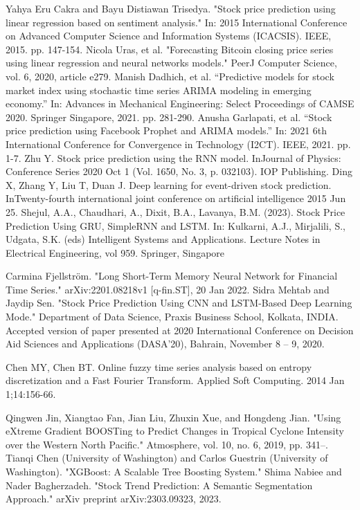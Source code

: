 \documentclass{ieeeojies}
\begin{document}
\begin{thebibliography}{00}
Yahya Eru Cakra and Bayu Distiawan Trisedya. "Stock price prediction using linear regression based on sentiment analysis." In: 2015 International Conference on Advanced Computer Science and Information Systems (ICACSIS). IEEE, 2015. pp. 147-154.
Nicola Uras, et al. "Forecasting Bitcoin closing price series using linear regression and neural networks models." PeerJ Computer Science, vol. 6, 2020, article e279.
Manish Dadhich, et al. ``Predictive models for stock market index using stochastic time series ARIMA modeling in emerging economy.'' In: Advances in Mechanical Engineering: Select Proceedings of CAMSE 2020. Springer Singapore, 2021. pp. 281-290.
Anusha Garlapati, et al. ``Stock price prediction using Facebook Prophet and ARIMA models.'' In: 2021 6th International Conference for Convergence in Technology (I2CT). IEEE, 2021. pp. 1-7.
Zhu Y. Stock price prediction using the RNN model. InJournal of Physics: Conference Series 2020 Oct 1 (Vol. 1650, No. 3, p. 032103). IOP Publishing. 
Ding X, Zhang Y, Liu T, Duan J. Deep learning for event-driven stock prediction. InTwenty-fourth international joint conference on artificial intelligence 2015 Jun 25.
Shejul, A.A., Chaudhari, A., Dixit, B.A., Lavanya, B.M. (2023). Stock Price Prediction Using GRU, SimpleRNN and LSTM. In: Kulkarni, A.J., Mirjalili, S., Udgata, S.K. (eds) Intelligent Systems and Applications. Lecture Notes in Electrical Engineering, vol 959. Springer, Singapore 

Carmina Fjellström. "Long Short-Term Memory Neural Network for Financial Time Series." arXiv:2201.08218v1 [q-fin.ST], 20 Jan 2022.
Sidra Mehtab and Jaydip Sen. "Stock Price Prediction Using CNN and LSTM-Based Deep Learning Mode." Department of Data Science, Praxis Business School, Kolkata, INDIA. Accepted version of paper presented at 2020 International Conference on Decision Aid Sciences and Applications (DASA’20), Bahrain, November 8 – 9, 2020.

Chen MY, Chen BT. Online fuzzy time series analysis based on entropy discretization and a Fast Fourier Transform. Applied Soft Computing. 2014 Jan 1;14:156-66. 

Qingwen Jin, Xiangtao Fan, Jian Liu, Zhuxin Xue, and Hongdeng Jian. "Using eXtreme Gradient BOOSTing to Predict Changes in Tropical Cyclone Intensity over the Western North Pacific." Atmosphere, vol. 10, no. 6, 2019, pp. 341–.
Tianqi Chen (University of Washington) and Carlos Guestrin (University of Washington). "XGBoost: A Scalable Tree Boosting System."
Shima Nabiee and Nader Bagherzadeh. "Stock Trend Prediction: A Semantic Segmentation Approach." arXiv preprint arXiv:2303.09323, 2023.



\end{thebibliography}
\end{document}
